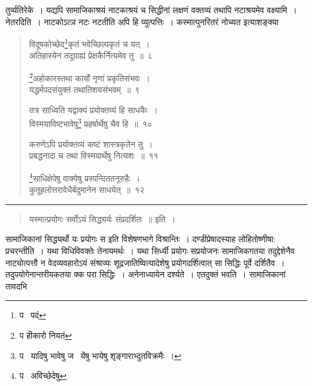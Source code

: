 \documentclass[11pt, openany]{book}
\begin{document}
\noindent
तुर्व्यतिरेके~। यद्यपि सामाजिकाश्रयं नाटकाश्रयं च सिद्धीनां लक्षणं वक्तव्यं तथापि नटाश्रयमेव वक्ष्यामि~। नेतरदिति~। नाटकोऽत्ञ नटः नटतीति अपि हि व्युत्पत्तिः~। कस्मात्पुनरितरं नोच्यत इत्याशङ्क्या\textendash

\newpage
{}

\begin{quote}
{\na विदूषकोच्छेद\renewcommand{\thefootnote}{1}\footnote{प \textendash\  पदं}कृतं भवेच्छिल्पकृतं च यत्~।\\
अतिहास्येन तदूग्राह्यं प्रेक्षकैर्नित्यमेव तु~॥~८

\renewcommand{\thefootnote}{2}\footnote{प हीकारो नियतं}अहोकारस्तथा कार्यो नृणां प्रकृतिसंभवः~।\\
यद्धर्मपदसंयुक्तं तथातिशयसंभवम्~॥~९

तत्र साध्विति यद्वाक्यं प्रयोक्तव्यं हि साधकैः~।\\
विस्मयाविष्टभावेषु\renewcommand{\thefootnote}{3}\footnote{प \textendash\  यादिषु भावेषु ज \textendash\  येंषु भायेषु शृङ्गाराभ्दुतविक्रमैः~।} प्रहर्षार्थेषु चैव हि~॥~१०

करुणेऽपि प्रयोक्तव्यं कष्टं शास्त्रकृतेन तु~।\\
प्रबद्धनादा च तथा विस्मयार्थेषु नित्यशः~॥~११

\renewcommand{\thefootnote}{4}\footnote{प \textendash\  अविच्छेदेषु}साधिक्षेपेषु वाक्येषु प्रस्पन्दिततनूरुहैः~।\\
कुतूहलोत्तरावेधैर्बदुमानेन साधयेत्~॥~१२}
\end{quote}

\hrule

\begin{quote}
{\qt यस्मात्प्रयोगः सर्वोऽयं सिद्ध्यर्यः संप्रदर्शितः~॥} इति~।
\end{quote}

\noindent
सामाजिकानां सिद्ध्यर्थो यः प्रयोगः स इति विशेषणभागे विश्रान्तिः~। दण्डीप्रेषादस्याह लोहितोष्णीषा: प्रचरन्तीति~। यथा विधिविवक्तेः तेनायमर्थः~। यथा सिर्ध्यी प्रयोगः सप्रयोजनः सामाजिकगतया तदुद्देशेनैव नाट्योत्पत्तौ न वेदव्यवहारोऽयं संश्राव्यः शूद्रजातिष्वित्यादेशेषु प्रयोगदर्शित्वात् सा सिद्धिः पूर्वे दर्शितैव~। तदुपयोगेनान्तरीयकतया क्क परा सिद्धिः~। अनेनाध्यायेन दर्श्यते~। एतदुक्तं भवति~। सामाजिकानां तावदभि\textendash

\newpage
\end{document}
